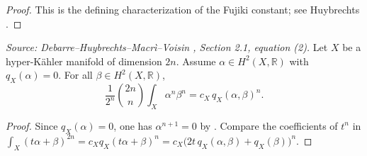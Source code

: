 \begin{proof}
  This is the defining characterization of the Fujiki constant; see Huybrechts
  \cite[Proposition~23.14]{huy}.
\end{proof}

\begin{lemma}
  \label{lem:fujiki-polarized}
  \textit{Source: Debarre--Huybrechts--Macr\`i--Voisin \cite{MR4654610}, Section 2.1, equation (2).}
  Let \(X\) be a hyper-K\"ahler manifold of dimension \(2n\).  Assume
  \(\alpha \in H^2(X, \mathbb{R})\) with \(q_X(\alpha) = 0\).  For all
  \(\beta \in H^2(X, \mathbb{R})\),
  \[
    \frac{1}{2^n}\binom{2n}{n}\int_X \alpha^n \beta^n = c_X\, q_X(\alpha, \beta)^n.
  \]
\end{lemma}

\begin{proof}
  Since \(q_X(\alpha) = 0\), one has \(\alpha^{n+1} = 0\) by
  \cite[Proposition~24.1]{huy}.  Compare the coefficients of \(t^n\) in
  \(\int_X (t\alpha + \beta)^{2n} = c_X q_X(t\alpha + \beta)^n
    = c_X\bigl(2t\,q_X(\alpha, \beta) + q_X(\beta)\bigr)^n\).
\end{proof}

